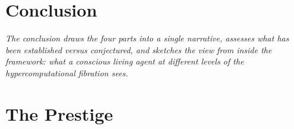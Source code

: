 \documentclass[12pt,openright,twoside]{book}
\theoremstyle{remark}
\theoremstyle{plain}
\theoremstyle{remark}
\theoremstyle{plain}
\theoremstyle{plain}
\begin{document}
\bigskip



\part*{Conclusion}

\vspace{1em}
\begin{mdframed}[backgroundcolor=remarkgray, linecolor=gray!60,
                 linewidth=1pt, topline=false, rightline=false,
                 bottomline=false]
\small\itshape
The conclusion draws the four parts into a single narrative,
assesses what has been established versus conjectured, and
sketches the view from inside the framework: what a conscious
living agent at different levels of the hypercomputational
fibration sees.
\end{mdframed}

\bigskip


\part{The Prestige}
\end{document}
